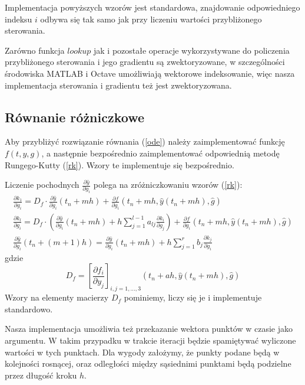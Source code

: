 \documentclass[11pt]{article}
\begin{document}
Implementacja powyższych wzorów jest standardowa, znajdowanie odpowiedniego indeksu $i$ odbywa się tak samo jak przy liczeniu wartości przybliżonego sterowania.

Zarówno funkcja $lookup$ jak i pozostałe operacje wykorzystywane do policzenia przybliżonego sterowania i jego gradientu są zwektoryzowane, w szczególności środowiska MATLAB i Octave umożliwiają wektorowe indeksowanie, więc nasza implementacja sterowania i gradientu też jest zwektoryzowana.

\subsection{Równanie różniczkowe}
Aby przybliżyć rozwiązanie równania (\ref{ode}) należy zaimplementować funkcję $f(t,y,g)$, a następnie bezpośrednio zaimplementować odpowiednią metodę Rungego-Kutty (\ref{rk}). Wzory te implementuje się bezpośrednio.

Liczenie pochodnych $\frac{\partial \hat{y}}{\partial g_i}$ polega na zróżniczkowaniu wzorów (\ref{rk}):
\begin{gather}
    \frac{\partial k_1}{\partial g_i} = D_f \cdot \frac{\partial \hat{y}}{\partial g_i}(t_n + mh) + \frac{\partial f}{\partial g_i}(t_n + mh, \hat{y}(t_n + mh), \hat{g}) \nonumber \\
    \frac{\partial k_l}{\partial g_i}  = D_f \cdot \left(\frac{\partial \hat{y}}{\partial g_i}(t_n + mh) + h\sum_{j=1}^{l-1} a_{lj}\frac{\partial k_i}{\partial g_j} \right) + \frac{\partial f}{\partial g_i}(t_n + mh, \hat{y}(t_n + mh), \hat{g})  \label{drk}\\
    \frac{\partial \hat{y}}{\partial g_i}(t_n + (m+1)h) = \frac{\partial \hat{y}}{\partial g_i}(t_n + mh) + h\sum_{j=1}^r b_j \frac{\partial k_j}{\partial g_i} \nonumber
\end{gather}
gdzie
\begin{equation} \label{Df}
  D_f = {\left[\frac{\partial f_i}{\partial y_j}\right]}_{i,j = 1,\ldots, 3} (t_n + ah, \hat{y}(t_n + mh), \hat{g})
\end{equation}
Wzory na elementy macierzy $D_f$ pominiemy, liczy się je i implementuje standardowo.

Nasza implementacja umożliwia też przekazanie wektora punktów w czasie jako argumentu. W takim przypadku w trakcie iteracji będzie spamiętywać wyliczone wartości w tych punktach. Dla wygody założymy, że punkty podane będą w kolejności rosnącej, oraz odległości między sąsiednimi punktami będą podzielne przez długość kroku $h$.
\end{document}
